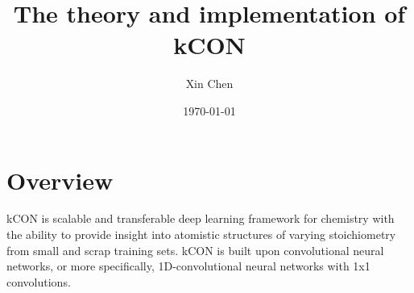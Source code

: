 \documentclass{article}
\title{The theory and implementation of kCON}
\author{Xin Chen}
\date{\today}
\begin{document}
\maketitle


\section{Overview}

kCON is scalable and transferable deep learning framework for chemistry with the ability to 
provide insight into atomistic structures of varying stoichiometry from small and scrap 
training sets. kCON is built upon convolutional neural networks, or more specifically, 
1D-convolutional neural networks with 1x1 convolutions.

\begin{center}
\end{center}




\newpage


\end{document}
